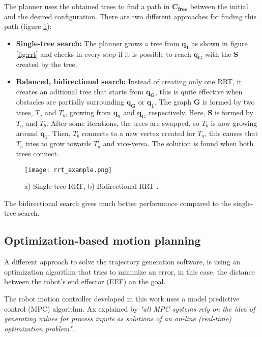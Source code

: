 The planner uses the obtained trees to find a path in $\bm{C_{free}}$ between the initial and the desired configuration. There are two different approaches for finding this path (figure \ref{fig:rrt_ex}):
\begin{itemize}
	\item \textbf{Single-tree search:} The planner grows a tree from $\bm{q_1}$ as shown in figure \ref{fig:rrt} and checks in every step if it is possible to reach $\bm{q_G}$ with the $\bm{S}$ created by the tree.
	\item \textbf{Balanced, bidirectional search:} Instead of creating only one RRT, it creates an aditional tree that starts from $\bm{q_G}$, this is quite effective when obstacles are partially surrounding $\bm{q_G}$ or $\bm{q_1}$. The graph $\bm{G}$ is formed by two trees, $T_a$ and $T_b$, growing from $\bm{q_1}$ and $\bm{q_G}$ respectively. Here, $\bm{S}$ is formed by $T_a$ and $T_b$. After some iterations, the trees are swapped, so $T_b$ is now growing around $\bm{q_1}$. Then, $T_b$ connects to a new vertex created for $T_a$, this causes that $T_b$ tries to grow towards $T_a$ and vice-versa. The solution is found when both trees connect.
\end{itemize}

\begin{figure}[H]
	\centering
	\texttt{[image: rrt\_example.png]}
	\vspace{-10pt}
	\caption[Single and bidirectional RTT]{ a) Single tree RRT, b) Bidirectional RRT \citep[chap.5, page 219]{planning}.}
	\vspace{-15pt}
	\label{fig:rrt_ex}
\end{figure}

The bidirectional search gives much better performance compared to the single-tree search.

\subsection{Optimization-based motion planning}
\label{sub:optimization}
A different approach to solve the trajectory generation software, is using an optimization algorithm that tries to minimize an error, in this case, the distance between the robot's end effector (EEF) an the goal.
 
The robot motion controller developed in this work uses a model predictive control (MPC) algorithm. Ax explained by \citet{mpc} \textit{"all MPC	systems rely on the idea of generating values for process inputs as solutions of an on-line (real-time) optimization problem"}. 

